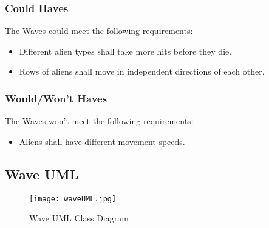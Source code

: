 \documentclass[10pt]{article}
\begin{document}
\subsubsection{Could Haves}
The Waves could meet the following requirements:
\begin{itemize}
	\item Different alien types shall take more hits before they die.
	\item Rows of aliens shall move in independent directions of each other.
\end{itemize}
\subsubsection{Would/Won't Haves}
The Waves won't meet the following requirements:
\begin{itemize}
	\item Aliens shall have different movement speeds.
\end{itemize}
\newpage
\subsection{Wave UML}
\begin{figure}[ht!]
\centering
\texttt{[image: waveUML.jpg]}
\caption{Wave UML Class Diagram}
\end{figure}
\end{document}
